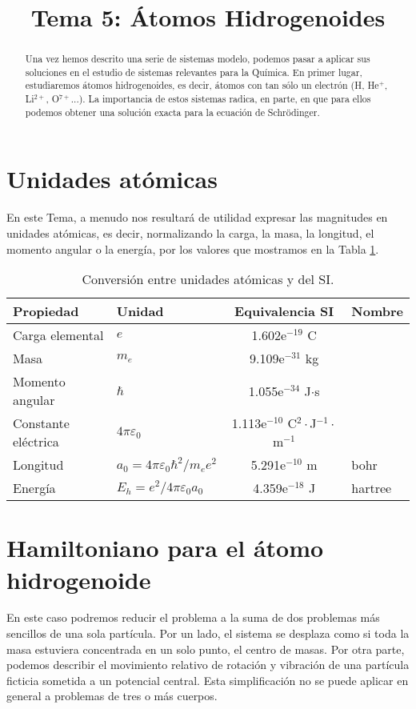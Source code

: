 \documentclass{tufte-handout}
\title[Química Física II: Tema 5 - Átomos hidrogenoides]{
Tema 5: Átomos Hidrogenoides}
\date{}  %
\begin{document}
\maketitle%

\begin{abstract}
\noindent Una vez hemos descrito una serie de sistemas modelo, podemos
pasar a aplicar sus soluciones en el estudio de sistemas
relevantes para la Química. En primer lugar, estudiaremos 
átomos hidrogenoides, es decir, átomos con tan sólo un
electrón (H, He$^+$, Li$^{2+}$, O$^{7+}$...). La importancia
de estos sistemas radica, en parte, en que para ellos
podemos obtener una solución exacta para la ecuación de
Schrödinger.
\end{abstract}



\section{Unidades atómicas}
En este Tema, a menudo nos resultará de utilidad expresar las 
magnitudes en unidades atómicas, es decir, normalizando la carga, 
la masa, la longitud, el momento angular o la energía, por los 
valores que mostramos en la Tabla \ref{tb:au}.

\begin{table}[h!]
    \centering
    \small{}
    \begin{tabular}{|l|l|c|l|}
    \hline
         Propiedad & Unidad & Equivalencia SI& Nombre  \\
    \hline
    \hline
         Carga elemental & $e$ & 1.602e$^{-19}$ C & \\ 
         Masa & $m_e$ & 9.109e$^{-31}$ kg & \\ 
         Momento angular & $\hbar$ & 1.055e$^{-34}$ J$\cdot$s & \\ 
         Constante eléctrica & $4\pi \varepsilon_0$ & 1.113e$^{-10}$ C$^2\cdot$J$^{-1}\cdot$m$^{-1}$ \\
         Longitud & $a_0=4\pi \varepsilon_0\hbar^2/m_ee^2$ & 5.291e$^{-10}$ m & bohr \\ 
         Energía & $E_h=e^2/4\pi \varepsilon_0a_0$  & 4.359e$^{-18}$ J & hartree \\ 
    \hline
    \end{tabular}
    \caption{Conversión entre unidades atómicas y del SI.}
    \label{tb:au}
\end{table}

\section{Hamiltoniano para el átomo hidrogenoide}
En este caso podremos reducir el problema a la suma de dos problemas 
más sencillos de una sola partícula. Por un lado, el sistema se 
desplaza como si toda la masa estuviera concentrada en un solo punto,
el centro de masas. Por otra parte, podemos describir el movimiento 
relativo de rotación y vibración de una partícula ficticia sometida 
a un potencial central. Esta simplificación no se puede aplicar en 
general a problemas de tres o más cuerpos.
\end{document}
